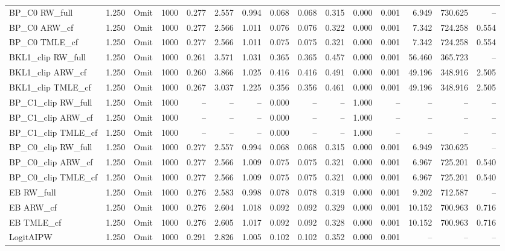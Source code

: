 \begin{tabular}{llllrrrrrrrrrrr}
BP\_C0 RW\_full & 1.250 & Omit & 1000 & 0.277 & 2.557 & 0.994 & 0.068 & 0.068 & 0.315 & 0.000 & 0.001 & 6.949 & 730.625 & -- \\
BP\_C0 ARW\_cf & 1.250 & Omit & 1000 & 0.277 & 2.566 & 1.011 & 0.076 & 0.076 & 0.322 & 0.000 & 0.001 & 7.342 & 724.258 & 0.554 \\
BP\_C0 TMLE\_cf & 1.250 & Omit & 1000 & 0.277 & 2.566 & 1.011 & 0.075 & 0.075 & 0.321 & 0.000 & 0.001 & 7.342 & 724.258 & 0.554 \\
BKL1\_clip RW\_full & 1.250 & Omit & 1000 & 0.261 & 3.571 & 1.031 & 0.365 & 0.365 & 0.457 & 0.000 & 0.001 & 56.460 & 365.723 & -- \\
BKL1\_clip ARW\_cf & 1.250 & Omit & 1000 & 0.260 & 3.866 & 1.025 & 0.416 & 0.416 & 0.491 & 0.000 & 0.001 & 49.196 & 348.916 & 2.505 \\
BKL1\_clip TMLE\_cf & 1.250 & Omit & 1000 & 0.267 & 3.037 & 1.225 & 0.356 & 0.356 & 0.461 & 0.000 & 0.001 & 49.196 & 348.916 & 2.505 \\
BP\_C1\_clip RW\_full & 1.250 & Omit & 1000 & -- & -- & -- & 0.000 & -- & -- & 1.000 & -- & -- & -- & -- \\
BP\_C1\_clip ARW\_cf & 1.250 & Omit & 1000 & -- & -- & -- & 0.000 & -- & -- & 1.000 & -- & -- & -- & -- \\
BP\_C1\_clip TMLE\_cf & 1.250 & Omit & 1000 & -- & -- & -- & 0.000 & -- & -- & 1.000 & -- & -- & -- & -- \\
BP\_C0\_clip RW\_full & 1.250 & Omit & 1000 & 0.277 & 2.557 & 0.994 & 0.068 & 0.068 & 0.315 & 0.000 & 0.001 & 6.949 & 730.625 & -- \\
BP\_C0\_clip ARW\_cf & 1.250 & Omit & 1000 & 0.277 & 2.566 & 1.009 & 0.075 & 0.075 & 0.321 & 0.000 & 0.001 & 6.967 & 725.201 & 0.540 \\
BP\_C0\_clip TMLE\_cf & 1.250 & Omit & 1000 & 0.277 & 2.566 & 1.009 & 0.075 & 0.075 & 0.321 & 0.000 & 0.001 & 6.967 & 725.201 & 0.540 \\
EB RW\_full & 1.250 & Omit & 1000 & 0.276 & 2.583 & 0.998 & 0.078 & 0.078 & 0.319 & 0.000 & 0.001 & 9.202 & 712.587 & -- \\
EB ARW\_cf & 1.250 & Omit & 1000 & 0.276 & 2.604 & 1.018 & 0.092 & 0.092 & 0.329 & 0.000 & 0.001 & 10.152 & 700.963 & 0.716 \\
EB TMLE\_cf & 1.250 & Omit & 1000 & 0.276 & 2.605 & 1.017 & 0.092 & 0.092 & 0.328 & 0.000 & 0.001 & 10.152 & 700.963 & 0.716 \\
LogitAIPW & 1.250 & Omit & 1000 & 0.291 & 2.826 & 1.005 & 0.102 & 0.102 & 0.352 & 0.000 & 0.001 & -- & -- & -- \\

\end{tabular}
